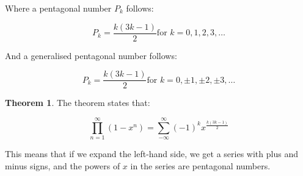 \documentclass{article}
\theoremstyle{definition}
\newtheorem{theorem}{Theorem}
\begin{document}
\noindent
Where a pentagonal number $P_k$ follows:

\[
P_k = \frac{k(3k - 1)}{2} \text{for $k = 0, 1, 2, 3, \dots$}
\]

\noindent
And a generalised pentagonal number follows:

\[
P_k = \frac{k(3k - 1)}{2} \text{for $k = 0, \pm 1, \pm 2, \pm 3, \dots$}
\]

\begin{theorem}
The theorem states that:

\[
\prod_{n=1}^{\infty} (1 - x^n) = \sum_{-\infty}^{\infty} (-1)^k x^{\frac{k(3k-1)}{2}}
\]

\noindent
This means that if we expand the left-hand side, we get a series with plus and minus signs, and the powers of $x$
in the series are pentagonal numbers.

\end{theorem}
\end{document}
